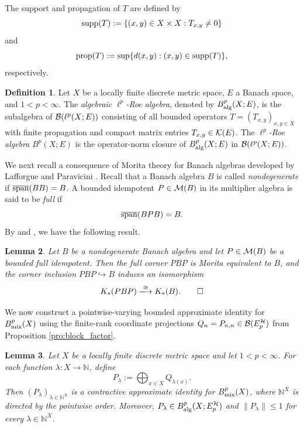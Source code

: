 \documentclass[11pt,reqno]{amsart}
\theoremstyle{definition}
\newtheorem{Def}{Definition}[section]
\theoremstyle{plain}
\newtheorem{Lem}[Def]{Lemma}
\def\IN{\mathbb N}\def\IR{\mathbb R}\def\IE{\mathbb E}\def\IC{\mathbb C}\def\IL{\mathbb L}\def\IQ{\mathbb Q}\def\IA{\mathbb A}\def\IZ{\mathbb Z}
\def\supp{\textup{supp}}
\def\prop{\textup{prop}}
\begin{document}
The support and propagation of $T$ are defined by
\[
\supp(T):=\{(x,y)\in X\times X:T_{x,y}\ne 0\}
\]
and
\[
\prop(T):=\sup\{d(x,y):(x,y)\in\supp(T)\},
\]
respectively.

\begin{Def}\label{def:Roe_alg}
Let $X$ be a locally finite discrete metric space, $E$ a Banach space, and $1 < p < \infty$. The \emph{algebraic $\ell^p$-Roe algebra}, denoted by $B^p_{\textup{alg}}(X; E)$, is the subalgebra of $\mathcal B(\ell^p(X; E))$ consisting of all bounded operators $T = (T_{x,y})_{x,y \in X}$ with finite propagation and compact matrix entries $T_{x,y} \in \mathcal K(E)$. The \emph{$\ell^p$-Roe algebra} $B^p(X; E)$ is the operator-norm closure of $B^p_{\textup{alg}}(X; E)$ in $\mathcal B(\ell^p(X; E))$.
\end{Def}

We next recall a consequence of Morita theory for Banach algebras developed by Lafforgue \cite{Laf02} and Paravicini \cite{Par09, Par15}. Recall that a Banach algebra $B$ is called \emph{nondegenerate} if $\overline{\textup{span}}(B B) = B$. A bounded idempotent $P \in \mathcal M(B)$ in its multiplier algebra is said to be \emph{full} if
\[
\overline{\textup{span}}(B P B) = B.
\]
By \cite[Proposition~5.3, Corollary~5.5, and Theorem~5.29]{Par09} and \cite[Th\'eor\`eme~1.2.8]{Laf02}, we have the following result.

\begin{Lem}\label{lem:corner_K}\pushQED{\qed}
Let $B$ be a nondegenerate Banach algebra and let $P \in \mathcal M(B)$ be a bounded full idempotent. Then the full corner $P B P$ is Morita equivalent to $B$, and the corner inclusion $P B P \hookrightarrow B$ induces an isomorphism
\[
K_*(P B P) \xlongrightarrow{\cong} K_*(B).\qedhere
\]
\popQED
\end{Lem}

We now construct a pointwise-varying bounded approximate identity for $B^p_{\textup{mix}}(X)$ using the finite-rank coordinate projections $Q_n=P_{n,n}\in\mathcal B(E_p^{\mathcal H})$ from Proposition \ref{pro:block_factor}.

\begin{Lem}\label{lem:bai_Roe}
Let $X$ be a locally finite discrete metric space and let $1<p<\infty$. For each function $\lambda:X\to\IN$, define
\[
P_\lambda:=\bigoplus_{x\in X}Q_{\lambda(x)}.
\]
Then $(P_\lambda)_{\lambda\in\IN^X}$ is a contractive approximate identity for $B^p_{\textup{mix}}(X)$, where $\IN^X$ is directed by the pointwise order. Moreover, $P_\lambda\in B^p_{\textup{alg}}(X;E_p^{\mathcal H})$ and $\|P_\lambda\|\le 1$ for every $\lambda\in\IN^X$.
\end{Lem}
\end{document}
